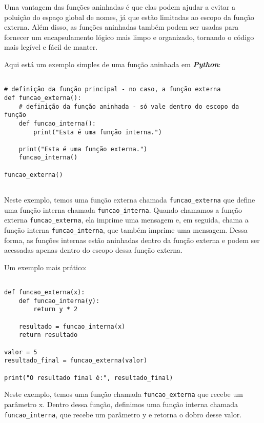 \documentclass[a4paper, 12pt, onecolumn,singlespacing]{article}
\begin{document}
	Uma vantagem das funções aninhadas é que elas podem ajudar a evitar a poluição do espaço global de nomes, já que estão limitadas ao escopo da função externa. Além disso, as funções aninhadas também podem ser usadas para fornecer um encapsulamento lógico mais limpo e organizado, tornando o código mais legível e fácil de manter.
	
	Aqui está um exemplo simples de uma função aninhada em \textbf{\textit{Python}}:

	\begin{verbatim}
		
# definição da função principal - no caso, a função externa
def funcao_externa():
	# definição da função aninhada - só vale dentro do escopo da função
	def funcao_interna():
		print("Esta é uma função interna.")

	print("Esta é uma função externa.")
	funcao_interna()

funcao_externa()
		
	\end{verbatim}

	Neste exemplo, temos uma função externa chamada \texttt{funcao\_externa} que define uma função interna chamada \texttt{funcao\_interna}. Quando chamamos a função externa \texttt{funcao\_externa}, ela imprime uma mensagem e, em seguida, chama a função interna \texttt{funcao\_interna}, que também imprime uma mensagem. Dessa forma, as funções internas estão aninhadas dentro da função externa e podem ser acessadas apenas dentro do escopo dessa função externa.
	
	Um exemplo mais prático:
	\begin{verbatim}

def funcao_externa(x):
	def funcao_interna(y):
		return y * 2

	resultado = funcao_interna(x)
	return resultado

valor = 5
resultado_final = funcao_externa(valor)

print("O resultado final é:", resultado_final)

	\end{verbatim}
Neste exemplo, temos uma função chamada \texttt{funcao\_externa} que recebe um parâmetro x. Dentro dessa função, definimos uma função interna chamada \texttt{funcao\_interna}, que recebe um parâmetro y e retorna o dobro desse valor.
\end{document}
